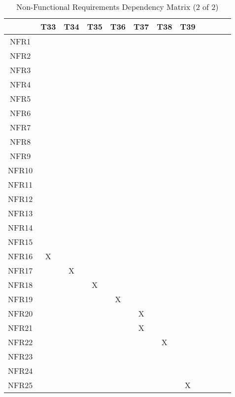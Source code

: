 \documentclass[12pt, titlepage]{article}
\begin{document}
\pagebreak
\begin{table}[H]
  \centering
  \caption{Non-Functional Requirements Dependency Matrix (2 of 2)}
  \begin{tabular}{|c|c|c|c|c|c|c|c|c|c|c|c|}
  \hline
    & T33 & T34 & T35 & T36 & T37 & T38 & T39\\
  \hline
  NFR1      & & & & & & & \\ 
  \hline
  NFR2      & & & & & & &  \\ 
  \hline
  NFR3      & & & & & & &  \\ 
  \hline
  NFR4      & & & & & & &  \\ 
  \hline
  NFR5      & & & & & & & \\ 
  \hline
  NFR6      & & & & & & &  \\ 
  \hline
  NFR7      & & & & & & &  \\ 
  \hline
  NFR8      & & & & & & &  \\ 
  \hline
  NFR9      & & & & & & &  \\ 
  \hline
  NFR10     & & & & & & &  \\ 
  \hline
  NFR11     & & & & & & &  \\ 
  \hline
  NFR12     & & & & & & &  \\ 
  \hline
  NFR13     & & & & & & &  \\ 
  \hline
  NFR14     & & & & & & &  \\ 
  \hline
  NFR15     & & & & & & &  \\  
  \hline
  NFR16     &X & & & & & & \\ 
  \hline
  NFR17     & &X & & & & & \\ 
  \hline
  NFR18     & & &X & & & &  \\ 
  \hline
  NFR19     & & & &X & & &  \\ 
  \hline
  NFR20     & & & & &X & & \\ 
  \hline
  NFR21     & & & & &X & & \\ 
  \hline
  NFR22     & & & & & &X &  \\ 
  \hline
  NFR23     & & & & & & & \\ 
  \hline
  NFR24     & & & & & & &  \\ 
  \hline
  NFR25     & & & & & & &X  \\ 
  \hline
  \end{tabular}
   \label{Table:C_trace}
\end{table}

\end{document}
